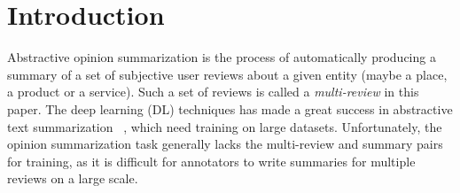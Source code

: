 \section{Introduction}
\label{sec:intro}
Abstractive opinion summarization is the process of 
automatically producing a summary of a set of 
subjective user reviews about a given entity 
(maybe a place, a product or a service). 
Such a set of reviews is called a {\em multi-review} in this paper. 
The deep learning (DL) techniques has made a great success 
in abstractive text summarization
~\cite{NallapatiZSGX16,SeeLM17,LiuLZ18,CelikyilmazBHC18,BART20}, which need training on large datasets.
Unfortunately, the opinion summarization task 
generally lacks the multi-review and summary pairs for training,
as it is difficult for annotators to write summaries for 
multiple reviews on a large scale.

